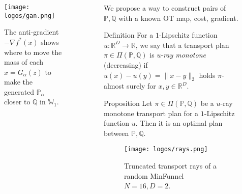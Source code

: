 \documentclass[final]{beamer}
\newlength{\sepwidth}
\newlength{\colwidth}
\newcommand{\separatorcolumn}{\begin{column}{\sepwidth}\end{column}}
\begin{document}
\begin{frame}[t]
\begin{columns}[t]
\begin{column}{\colwidth}
\begin{block}{ \noindent{}}
\begin{figure}
\vspace{-1 cm}
\texttt{[image: logos/gan.png]}
\vspace{-7 mm}
 \caption{ \centering The anti-gradient $-\nabla f^{*}(x)$ shows where to move the mass of each $x=G_{\alpha}(z)$ to make the generated $\mathbb{P}_{\alpha}$ closer to $\mathbb{Q}$ in $\mathbb{W}_{1}$.}
\end{figure}
\noindent{}
\end{block}
 

\end{column}

\separatorcolumn

\begin{column}{\colwidth}
\begin{block}{ \noindent{}}

We propose a way to construct pairs of $\mathbb{P},\mathbb{Q}$ with a known OT map, cost, gradient.

\noindent\begin{minipage}{0.55\textwidth}%
\vspace{-10 mm}
\begin{mytheo}{Definition}{}
For a $1$-Lipschitz function $u:\mathbb{R}^{D}\rightarrow\mathbb{R}$, we say that a transport plan $\pi\in\Pi(\mathbb{P},\mathbb{Q})$ is $u$-\textit{ray monotone} (decreasing) if $u(x)-u(y)=\|x-y\|_{2}$ holds $\pi$-almost surely for $x,y\in\mathbb{R}^{D}.$
\end{mytheo} 
\vspace{8 mm}
\begin{mytheo}{Proposition}{}
    Let $\pi\in\Pi(\mathbb{P},\mathbb{Q})$ be a $u$-ray monotone transport plan for a $1$-Lipschitz function $u$. Then it is an optimal plan between $\mathbb{P},\mathbb{Q}.$
\end{mytheo} 

\end{minipage}%
\hfill%
\begin{minipage}
{0.45\textwidth}\RaggedRight
\begin{figure}
\vspace{1 mm}
\texttt{[image: logos/rays.png]}
\vspace{-4 mm}
\caption{\centering Truncated transport rays of a random MinFunnel $N=16, D=2$.}
\end{figure}
\end{minipage}  
  

\end{block}
\end{column}
\end{columns}
\end{frame}
\end{document}
